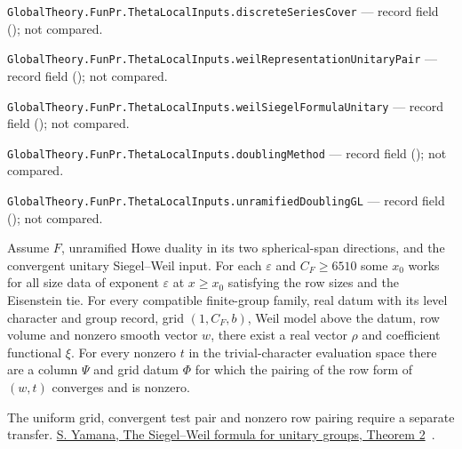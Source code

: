 \noindent\nolinkurl{GlobalTheory.FunPr.ThetaLocalInputs.discreteSeriesCover} --- record field (); not compared.\par
\noindent\nolinkurl{GlobalTheory.FunPr.ThetaLocalInputs.weilRepresentationUnitaryPair} --- record field (); not compared.\par
\noindent\nolinkurl{GlobalTheory.FunPr.ThetaLocalInputs.weilSiegelFormulaUnitary} --- record field (); not compared.\par
\noindent\nolinkurl{GlobalTheory.FunPr.ThetaLocalInputs.doublingMethod} --- record field (); not compared.\par
\noindent\nolinkurl{GlobalTheory.FunPr.ThetaLocalInputs.unramifiedDoublingGL} --- record field (); not compared.\par

\begin{formalstatement}\label{sub:T09}

Assume $F$, unramified Howe duality in its two spherical-span directions, and
the convergent unitary Siegel--Weil input. For each $\varepsilon$ and
$C_F\ge6510$ some $x_0$ works for all size data of exponent $\varepsilon$
at $x\ge x_0$ satisfying the row sizes and the Eisenstein tie. For every
compatible finite-group family, real datum with its level character and group
record, grid $(1,C_F,b)$, Weil model above the datum, row volume and
nonzero smooth vector $w$, there exist a real vector $\rho$ and coefficient
functional $\xi$. For every nonzero $t$ in the trivial-character evaluation
space there are a column $\Psi$ and grid datum $\Phi$ for which the
pairing of the row form of $(w,t)$ converges and is nonzero.

\end{formalstatement}

\noindent The uniform grid, convergent test pair and nonzero row pairing require a separate transfer. \href{https://msp.org/pjm/2013/264-1/pjm-v264-n1-p11-p.pdf}{S. Yamana, The Siegel–Weil formula for unitary groups, Theorem 2}~\cite{r21-yamana}.
